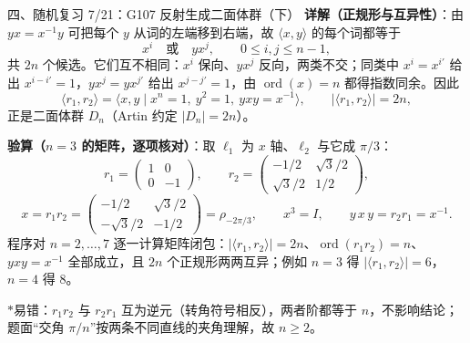\documentclass[aspectratio=169,10pt,fontset=none]{ctexbeamer}
\newcommand{\key}[1]{\textcolor{ink}{\bfseries #1}}
\newcommand{\starpt}{\textcolor{accent}{\bfseries$\ast$}}
\begin{document}
\begin{frame}[t]{四、随机复习 7/21：G107 反射生成二面体群（下）}
\scriptsize
\key{详解（正规形与互异性）}：由 $yx=x^{-1}y$ 可把每个 $y$ 从词的左端移到右端，故 $\langle x,y\rangle$ 的每个词都等于
\[ x^i\quad\text{或}\quad yx^j,\qquad 0\le i,j\le n-1, \]
共 $2n$ 个候选。它们互不相同：$x^i$ 保向、$yx^j$ 反向，两类不交；同类中 $x^i=x^{i'}$ 给出 $x^{i-i'}=1$，$yx^j=yx^{j'}$ 给出 $x^{j-j'}=1$，由 $\operatorname{ord}(x)=n$ 都得指数同余。因此
\[ \langle r_1,r_2\rangle=\langle x,y\mid x^n=1,\ y^2=1,\ yxy=x^{-1}\rangle,\qquad |\langle r_1,r_2\rangle|=2n, \]
正是二面体群 $D_n$（Artin 约定 $|D_n|=2n$）。

\key{验算（$n=3$ 的矩阵，逐项核对）}：取 $\ell_1$ 为 $x$ 轴、$\ell_2$ 与它成 $\pi/3$：
\[ r_1=\begin{pmatrix}1&0\\0&-1\end{pmatrix},\qquad r_2=\begin{pmatrix}-1/2&\sqrt3/2\\ \sqrt3/2&1/2\end{pmatrix}, \]
\[ x=r_1r_2=\begin{pmatrix}-1/2&\sqrt3/2\\ -\sqrt3/2&-1/2\end{pmatrix}=\rho_{-2\pi/3},\qquad x^3=I,\qquad y\,x\,y=r_2r_1=x^{-1}. \]
程序对 $n=2,\dots,7$ 逐一计算矩阵闭包：$|\langle r_1,r_2\rangle|=2n$、$\operatorname{ord}(r_1r_2)=n$、$yxy=x^{-1}$ 全部成立，且 $2n$ 个正规形两两互异；例如 $n=3$ 得 $|\langle r_1,r_2\rangle|=6$，$n=4$ 得 $8$。

\starpt 易错：$r_1r_2$ 与 $r_2r_1$ 互为逆元（转角符号相反），两者阶都等于 $n$，不影响结论；题面“交角 $\pi/n$”按两条不同直线的夹角理解，故 $n\ge2$。
\end{frame}

\end{document}

